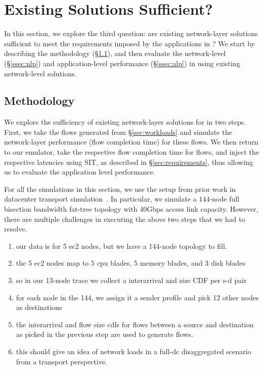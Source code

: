 \section{Existing Solutions Sufficient?}
\label{sec:existing}
In this section, we explore the third question: are existing network-layer solutions sufficient to meet the requirements imposed by the applications in \dis? We start by describing the methodology (\S\ref{ssec:ssmethod}), and then evaluate the network-level (\S\ref{ssec:nlp}) and application-level performance (\S\ref{ssec:alp}) in \dis using existing network-level solutions.

\subsection{Methodology}
\label{ssec:ssmethod}
We explore the sufficiency of existing network-layer solutions for \dis in two steps. First, we take the flows generated from \S\ref{sec:workloads} and simulate the network-layer performance (flow completion time) for these flows. We then return to our emulator, take the respective flow completion time for flows, and inject the respective latencies using SIT, as described in \S\ref{sec:requirements}, thus allowing us to evaluate the application level performance. 

For all the simulations in this section, we use the setup from prior work in datacenter transport simulation~\cite{pfabric, phost}. In particular, we simulate a $144$-node full bisection bandwidth fat-tree topology with $40$Gbps access link capacity.  However, there are multiple challenges in executing the above two steps that we had to resolve.

\begin{enumerate}
\item our data is for 5 ec2 nodes, but we have a 144-node topology to fill.
\item the 5 ec2 nodes map to 5 cpu blades, 5 memory blades, and 3 disk blades
\item so in our 13-node trace we collect a interarrival and size CDF per s-d pair
\item for each node in the 144, we assign it a sender profile and pick 12 other nodes as destinations
\item the interarrival and flow size cdfs for flows between a source and destination as picked in the previous step are used to generate flows.
\item this should give an idea of network loads in a full-dc disaggregated scenario from a transport perspective.
\end{enumerate}

